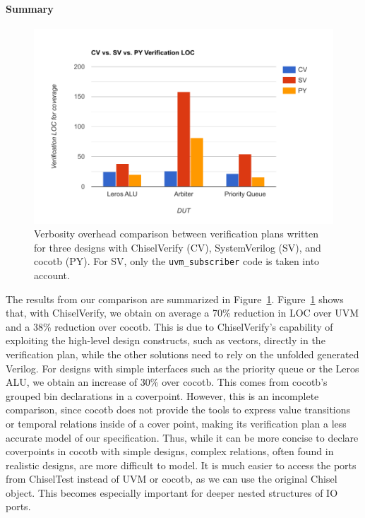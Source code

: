 \documentclass[conference]{IEEEtran}
\begin{document}
\paragraph{Summary}
\begin{figure}[h]
  \centering
  \includegraphics[trim=0.7cm 0.5cm 1cm 1cm, clip, width=.9\linewidth]{svcvpycomp.pdf}
  \caption{Verbosity overhead comparison between verification plans written for three designs with ChiselVerify (CV), SystemVerilog (SV), and cocotb (PY). For SV, only the \texttt{uvm\_subscriber} code is taken into account. }
  \label{fig:cvsvpycomp}
  \end{figure}
  
The results from our comparison are summarized in Figure~\ref{fig:cvsvpycomp}.
Figure~\ref{fig:cvsvpycomp} shows that, with ChiselVerify, we obtain on average a 70\% reduction in LOC over UVM and a 38\% reduction over cocotb. 
This is due to ChiselVerify's capability of exploiting the high-level design constructs, such as vectors, directly in the verification plan, while the other solutions need to rely on the unfolded generated Verilog.
For designs with simple interfaces such as the priority queue or the Leros ALU, we obtain an increase of 30\% over cocotb. 
This comes from cocotb's grouped bin declarations in a coverpoint.
However, this is an incomplete comparison, since cocotb does not provide the tools to express value transitions or temporal relations inside of a cover point, making its verification plan a less accurate model of our specification.
Thus, while it can be more concise to declare coverpoints in cocotb with simple designs, complex relations, often found in realistic designs, are more difficult to model.
It is much easier to access the ports from ChiselTest instead of UVM or cocotb, as we can use the original Chisel object.
This becomes especially important for deeper nested structures of IO ports.
\end{document}
